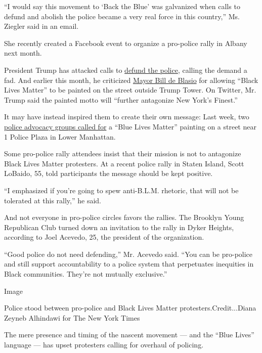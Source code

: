 ``I would say this movement to `Back the Blue' was galvanized when calls
to defund and abolish the police became a very real force in this
country,'' Ms. Ziegler said in an email.

She recently created a Facebook event to organize a pro-police rally in
Albany next month.

President Trump has attacked calls to
\href{https://www.nytimes3xbfgragh.onion/2020/07/13/us/politics/trump-police-reform.html?searchResultPosition=3}{defund
the police}, calling the demand a fad. And earlier this month, he
criticized
\href{https://www.nytimes3xbfgragh.onion/2020/06/25/nyregion/black-lives-matter-trump-tower-nyc.html}{Mayor
Bill de Blasio} for allowing ``Black Lives Matter'' to be painted on the
street outside Trump Tower. On Twitter, Mr. Trump said the painted motto
will ``further antagonize New York's Finest.''

It may have instead inspired them to create their own message: Last
week, two
\href{https://www.ny1.com/nyc/all-boroughs/news/2020/07/16/group-wants-blue-lives-matter-mural-near-nypd-headquarters}{police
advocacy groups called for} a ``Blue Lives Matter'' painting on a street
near 1 Police Plaza in Lower Manhattan.

Some pro-police rally attendees insist that their mission is not to
antagonize Black Lives Matter protesters. At a recent police rally in
Staten Island, Scott LoBaido, 55, told participants the message should
be kept positive.

``I emphasized if you're going to spew anti-B.L.M. rhetoric, that will
not be tolerated at this rally,'' he said.

And not everyone in pro-police circles favors the rallies. The Brooklyn
Young Republican Club turned down an invitation to the rally in Dyker
Heights, according to Joel Acevedo, 25, the president of the
organization.

``Good police do not need defending,'' Mr. Acevedo said. ``You can be
pro-police and still support accountability to a police system that
perpetuates inequities in Black communities. They're not mutually
exclusive.''

Image

Police stood between pro-police and Black Lives Matter
protesters.Credit...Diana Zeyneb Alhindawi for The New York Times

The mere presence and timing of the nascent movement --- and the ``Blue
Lives'' language --- has upset protesters calling for overhaul of
policing.

